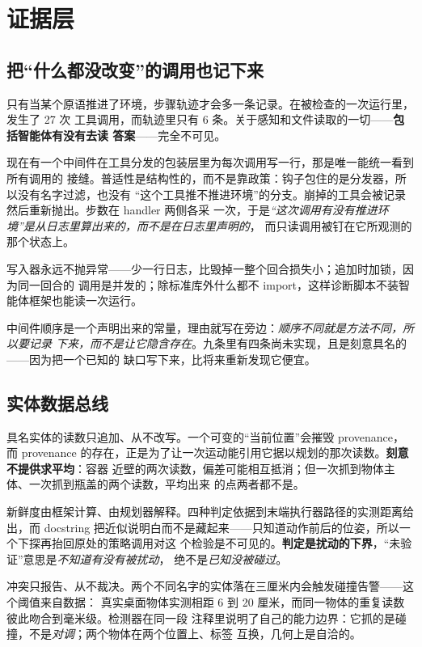 \documentclass[11pt,a4paper,UTF8,fontset=macnew]{ctexrep}
\begin{document}
\chapter{证据层}
\label{ch:evidence}

\section{把“什么都没改变”的调用也记下来}

只有当某个原语推进了环境，步骤轨迹才会多一条记录。在被检查的一次运行里，发生了 27 次
工具调用，而轨迹里只有 6 条。关于感知和文件读取的一切——\textbf{包括智能体有没有去读
答案}——完全不可见。

现在有一个中间件在工具分发的包装层里为每次调用写一行，那是唯一能统一看到所有调用的
接缝。普适性是结构性的，而不是靠政策：钩子包住的是分发器，所以没有名字过滤，也没有
“这个工具推不推进环境”的分支。崩掉的工具会被记录然后重新抛出。步数在 handler 两侧各采
一次，于是\emph{“这次调用有没有推进环境”是从日志里算出来的，而不是在日志里声明的}，
而只读调用被钉在它所观测的那个状态上。

写入器永远不抛异常——少一行日志，比毁掉一整个回合损失小；追加时加锁，因为同一回合的
调用是并发的；除标准库外什么都不 import，这样诊断脚本不装智能体框架也能读一次运行。

中间件顺序是一个声明出来的常量，理由就写在旁边：\emph{顺序不同就是方法不同，所以要记录
下来，而不是让它隐含存在}。九条里有四条尚未实现，且是刻意具名的——因为把一个已知的
缺口写下来，比将来重新发现它便宜。

\section{实体数据总线}

具名实体的读数只追加、从不改写。一个可变的“当前位置”会摧毁 provenance，而 provenance
的存在，正是为了让一次运动能引用它据以规划的那次读数。\textbf{刻意不提供求平均}：容器
近壁的两次读数，偏差可能相互抵消；但一次抓到物体主体、一次抓到瓶盖的两个读数，平均出来
的点两者都不是。

新鲜度由框架计算、由规划器解释。四种判定依据到末端执行器路径的实测距离给出，而 docstring
把近似说明白而不是藏起来——只知道动作前后的位姿，所以一个下探再抬回原处的策略调用对这
个检验是不可见的。\textbf{判定是扰动的下界}，“未验证”意思是\emph{不知道有没有被扰动}，
绝不是\emph{已知没被碰过}。

冲突只报告、从不裁决。两个不同名字的实体落在三厘米内会触发碰撞告警——这个阈值来自数据：
真实桌面物体实测相距 6 到 20 厘米，而同一物体的重复读数彼此吻合到毫米级。检测器在同一段
注释里说明了自己的能力边界：它抓的是碰撞，不是\emph{对调}；两个物体在两个位置上、标签
互换，几何上是自洽的。
\end{document}
